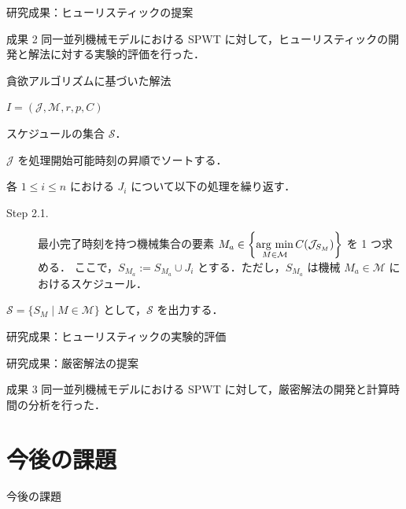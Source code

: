 \documentclass[dvipdfmx]{beamer}
\newcommand{\argmin}{\mathop{\rm arg~min}\limits}
\begin{document}
\begin{frame}{研究成果：ヒューリスティックの提案}
  \begin{alertblock}{成果 2}
    同一並列機械モデルにおける SPWT に対して，ヒューリスティックの開発と解法に対する実験的評価を行った．
  \end{alertblock}
  \begin{block}{貪欲アルゴリズムに基づいた解法}
    \begin{description}
      \setlength{\leftskip}{-10mm}
      \item[入力 :] $I = (\mathcal{J}, \mathcal{M},r,p,C)$
      \item[出力 :] スケジュールの集合 $\mathcal{S}$．
      \begin{description}
        \setlength{\leftskip}{-25mm}
        \item[Step 1.]
        $\mathcal{J}$ を処理開始可能時刻の昇順でソートする．
        \item[Step 2.]
        各 $1 \le i \le n$ における $J_i$ について以下の処理を繰り返す．
        \begin{description}
          \item[Step 2.1.]
          \setlength{\leftskip}{-40mm}
          最小完了時刻を持つ機械集合の要素 $M_a \in \left\{ \displaystyle \argmin_{M \in \mathcal{M}}C(\mathcal{J}_{S_M})\right\}$ を 1 つ求める．
          ここで，$S_{M_a} := S_{M_a} \cup J_i$ とする．ただし，$S_{M_a}$ は機械 $M_a \in \mathcal{M}$ におけるスケジュール．
        \end{description}
        \item[Step 3.]
        $\mathcal{S} = \{ S_M \mid M \in \mathcal{M}\}$ として，$\mathcal{S}$ を出力する．
      \end{description}
    \end{description}
  \end{block}
\end{frame}

\begin{frame}{研究成果：ヒューリスティックの実験的評価}

\end{frame}

\begin{frame}{研究成果：厳密解法の提案}
  \begin{alertblock}{成果 3}
    同一並列機械モデルにおける SPWT に対して，厳密解法の開発と計算時間の分析を行った．
  \end{alertblock}

\end{frame}
\section{今後の課題}
\begin{frame}{今後の課題}

\end{frame}
\end{document}
